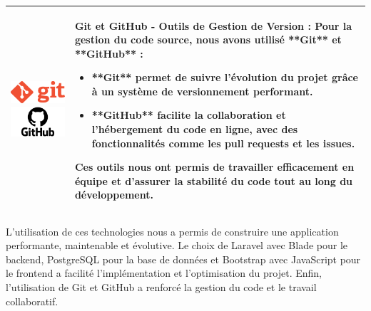 \begin{longtable}{|m{4cm}|m{10cm}|}
    \includegraphics[width=3cm]{images/logo/git.png}  
    \includegraphics[width=3cm]{images/logo/github.png} & 
    \textbf{Git et GitHub - Outils de Gestion de Version} : Pour la gestion du code source, nous avons utilisé **Git** et **GitHub** :  
    \begin{itemize}
        \item **Git** permet de suivre l'évolution du projet grâce à un système de versionnement performant.
        \item **GitHub** facilite la collaboration et l’hébergement du code en ligne, avec des fonctionnalités comme les pull requests et les issues.
    \end{itemize}
    Ces outils nous ont permis de travailler efficacement en équipe et d’assurer la stabilité du code tout au long du développement.\\
    \hline

\end{longtable}
\begin{center}  
    \label{tab:table_techs_realisation} %
\end{center}  
L’utilisation de ces technologies nous a permis de construire une application performante, maintenable et évolutive. Le choix de Laravel avec Blade pour le backend, PostgreSQL pour la base de données et Bootstrap avec JavaScript pour le frontend a facilité l’implémentation et l’optimisation du projet. Enfin, l’utilisation de Git et GitHub a renforcé la gestion du code et le travail collaboratif.

